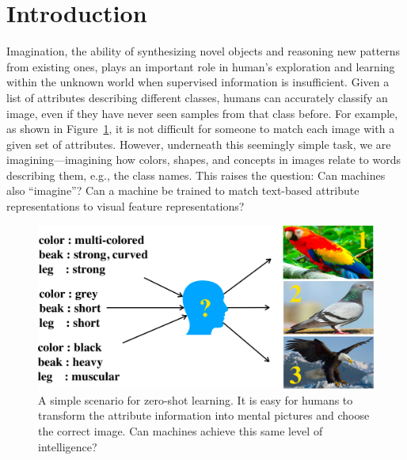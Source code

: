 \documentclass[letterpaper]{article} %
\begin{document}
\section{Introduction}
Imagination, the ability of synthesizing novel objects and reasoning new patterns from existing ones, plays an important role in human's exploration and learning within the unknown world when supervised information is insufficient.
Given a list of attributes describing different classes, humans can accurately classify an image, even if they have never seen samples from that class before.
For example, as shown in Figure~\ref{fig:zero-shot-simple}, it is not difficult for someone to match each image with a given set of attributes.
However, underneath this seemingly simple task, we are imagining---imagining how colors, shapes, and concepts in images relate to words describing them, e.g., the class names. This raises the question: Can machines also ``imagine''? Can a machine be trained to match text-based attribute representations to visual feature representations?
\begin{figure}[t!]
\begin{center}
\includegraphics[width=0.9\columnwidth]{zero-shot-example-v2-crop-.pdf}
\end{center}
\caption{A simple scenario for zero-shot learning.
It is easy for humans to transform the attribute information into mental pictures and choose the correct image. Can machines achieve this same level of intelligence?}
\label{fig:zero-shot-simple}
\end{figure}
\end{document}
